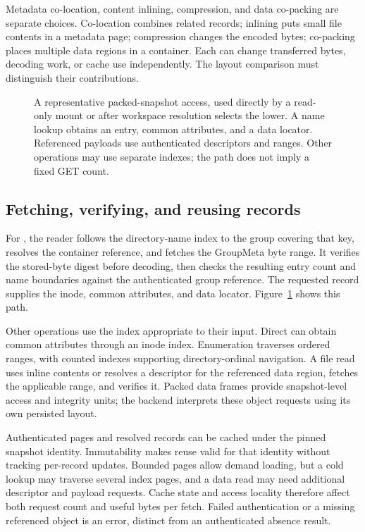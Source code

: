 Metadata co-location, content inlining, compression, and data co-packing
are separate choices. Co-location combines related records; inlining puts
small file contents in a metadata page; compression changes the encoded
bytes; co-packing places multiple data regions in a container. Each can
change transferred bytes, decoding work, or cache use independently. The
layout comparison must distinguish their contributions.

\begin{figure}[t]
\centering

\caption{A representative packed-snapshot access, used directly by a
read-only mount or after workspace resolution selects the lower. A name
lookup obtains an entry, common attributes, and a data locator. Referenced
payloads use authenticated descriptors and ranges. Other operations may
use separate indexes; the path does not imply a fixed GET count.}
\label{fig:packed}
\end{figure}

\subsection{Fetching, verifying, and reusing records}

For , the reader follows the directory-name index
to the group covering that key, resolves the container reference, and
fetches the GroupMeta byte range. It verifies the stored-byte digest before
decoding, then checks the resulting entry count and name boundaries against
the authenticated group reference. The requested record supplies the inode,
common attributes, and data locator. Figure~\ref{fig:packed} shows this path.

Other operations use the index appropriate to their input. Direct
 can obtain common attributes through an inode index.
Enumeration traverses ordered ranges, with counted indexes supporting
directory-ordinal navigation. A file read uses inline contents or resolves
a descriptor for the referenced data region, fetches the applicable range,
and verifies it. Packed data frames provide snapshot-level access and
integrity units; the backend interprets these object requests using its own
persisted layout.

Authenticated pages and resolved records can be cached under the pinned
snapshot identity. Immutability makes reuse valid for that identity without
tracking per-record updates. Bounded pages allow demand loading, but a cold
lookup may traverse several index pages, and a data read may need additional
descriptor and payload requests. Cache state and access locality therefore
affect both request count and useful bytes per fetch. Failed authentication
or a missing referenced object is an error, distinct from an authenticated
absence result.

